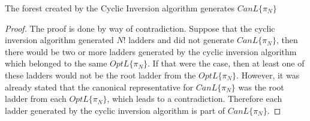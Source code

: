 \begin{lemma}
  The forest created by the Cyclic Inversion algorithm generates $CanL\{\pi_{N}\}$
\end{lemma}
\begin{proof}
  The proof is done by way of contradiction. Suppose that the cyclic inversion algorithm generated $N!$ ladders and did not generate $CanL\{\pi_{N}\}$, 
  then there would be two or more ladders generated by the cyclic inversion algorithm which belonged to the same $OptL\{\pi_{N}\}$. If that were the 
  case, then at least one of these ladders would not be the root ladder from the $OptL\{\pi_{N}\}$. However, it was already stated that the canonical 
  representative for $CanL\{\pi_{N}\}$ was the root ladder from each $OptL\{\pi_{N}\}$, which leads to a contradiction. Therefore each ladder generated 
  by the cyclic inversion algorithm is part of $CanL\{\pi_{N}\}$. 
\end{proof}

